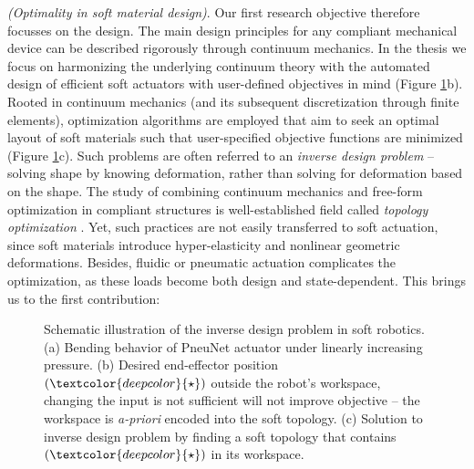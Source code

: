\par \textit{(Optimality in soft material design)}. Our first research objective therefore focusses on the design. The main design principles for any compliant mechanical device can be described rigorously through continuum mechanics. In the thesis we focus on harmonizing the underlying continuum theory with the automated design of efficient soft actuators with user-defined objectives in mind (Figure \ref{fig:C0:contribOne}b). Rooted in continuum mechanics \cite{Holzapfel2002,Kim2018} (and its subsequent discretization through finite elements), optimization algorithms are employed that aim to seek an optimal layout of soft materials such that user-specified objective functions are minimized (Figure \ref{fig:C0:contribOne}c). Such problems are often referred to an \textit{inverse design problem} -- solving shape by knowing deformation, rather than solving for deformation based on the shape. The study of combining continuum mechanics and free-form optimization in compliant structures is well-established field called \textit{topology optimization} \cite{Bendsoe2003}. Yet, such practices are not easily transferred to soft actuation, since soft materials introduce hyper-elasticity and nonlinear geometric deformations. Besides, fluidic or pneumatic actuation complicates the optimization, as these loads become both design and state-dependent. This brings us to the first contribution:
%
\begin{figure}[!t]
  \vspace{-4mm}
  \ifx\printFigures\undefined
  \else
  \fi
  \caption{Schematic illustration of the inverse design problem in soft robotics. (a) Bending behavior of PneuNet actuator under linearly increasing pressure. (b) Desired end-effector position $(\textcolor{deepcolor}{\star})$ outside the robot's workspace, changing the input is not sufficient will not improve objective -- the workspace is \textit{a-priori} encoded into the soft topology. (c) Solution to inverse design problem by finding a soft topology that contains $(\textcolor{deepcolor}{\star})$ in its workspace.}
  \vspace{-6mm}
  \label{fig:C0:contribOne}
\end{figure}
%


